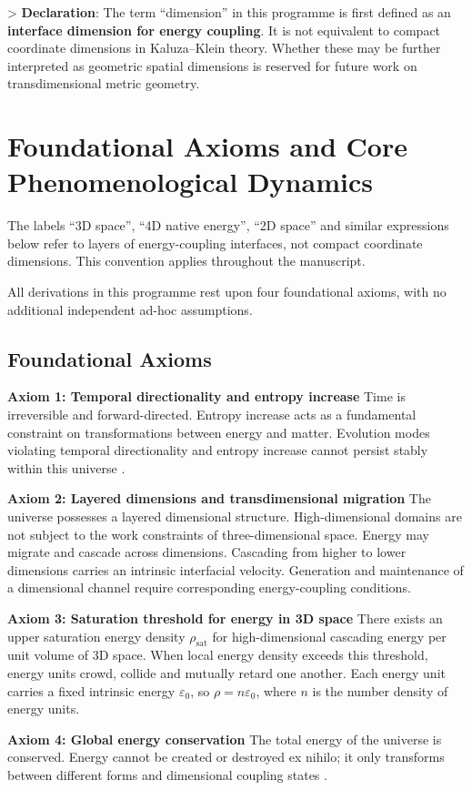 \documentclass[12pt,a4paper]{article}
\begin{document}
> \textbf{Declaration}: The term “dimension” in this programme is first defined as an \textbf{interface dimension for energy coupling}. It is not equivalent to compact coordinate dimensions in Kaluza–Klein theory. Whether these may be further interpreted as geometric spatial dimensions is reserved for future work on transdimensional metric geometry.

\section{Foundational Axioms and Core Phenomenological Dynamics}
The labels “3D space”, “4D native energy”, “2D space” and similar expressions below refer to layers of energy-coupling interfaces, not compact coordinate dimensions. This convention applies throughout the manuscript.

All derivations in this programme rest upon four foundational axioms, with no additional independent ad-hoc assumptions.

\subsection{Foundational Axioms}
\textbf{Axiom 1: Temporal directionality and entropy increase}
Time is irreversible and forward-directed. Entropy increase acts as a fundamental constraint on transformations between energy and matter. Evolution modes violating temporal directionality and entropy increase cannot persist stably within this universe \cite{landau1980}.

\textbf{Axiom 2: Layered dimensions and transdimensional migration}
The universe possesses a layered dimensional structure. High-dimensional domains are not subject to the work constraints of three-dimensional space. Energy may migrate and cascade across dimensions. Cascading from higher to lower dimensions carries an intrinsic interfacial velocity. Generation and maintenance of a dimensional channel require corresponding energy-coupling conditions.

\textbf{Axiom 3: Saturation threshold for energy in 3D space}
There exists an upper saturation energy density $\rho_{\text{sat}}$ for high-dimensional cascading energy per unit volume of 3D space. When local energy density exceeds this threshold, energy units crowd, collide and mutually retard one another. Each energy unit carries a fixed intrinsic energy $\varepsilon_0$, so $\rho = n \varepsilon_0$, where $n$ is the number density of energy units.

\textbf{Axiom 4: Global energy conservation}
The total energy of the universe is conserved. Energy cannot be created or destroyed ex nihilo; it only transforms between different forms and dimensional coupling states \cite{noether1918}.
\end{document}
